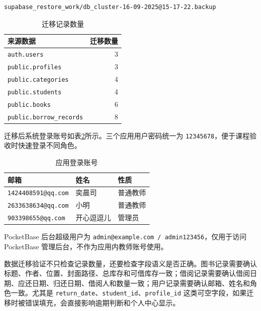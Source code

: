 \begin{lstlisting}[style=codexcode]
supabase_restore_work/db_cluster-16-09-2025@15-17-22.backup
\end{lstlisting}

\begin{table}[htbp]
\centering
\caption{迁移记录数量}
\label{tab:migration-count}
\begin{tabular}{l|r}
\toprule
\textbf{来源数据} & \textbf{迁移数量} \\
\midrule
\texttt{auth.users} & 3 \\
\texttt{public.profiles} & 3 \\
\texttt{public.categories} & 4 \\
\texttt{public.students} & 4 \\
\texttt{public.books} & 6 \\
\texttt{public.borrow\_records} & 8 \\
\bottomrule
\end{tabular}
\end{table}

迁移后系统登录账号如表\ref{tab:accounts}所示。三个应用用户密码统一为 \texttt{12345678}，便于课程验收时快速登录不同角色。

\begin{table}[htbp]
\centering
\caption{应用登录账号}
\label{tab:accounts}
\begin{tabular}{lll}
\toprule
\textbf{邮箱} & \textbf{姓名} & \textbf{性质} \\
\midrule
\texttt{1424408591@qq.com} & 奕晨司 & 普通教师 \\
\texttt{2633638634@qq.com} & 小明 & 普通教师 \\
\texttt{903398655@qq.com} & 开心逗逗儿 & 管理员 \\
\bottomrule
\end{tabular}
\end{table}

PocketBase 后台超级用户为 \texttt{admin@example.com / admin123456}，仅用于访问 PocketBase 管理后台，不作为应用内教师账号使用。

数据迁移验证不只检查记录数量，还要检查字段语义是否正确。图书记录需要确认标题、作者、位置、封面路径、总库存和可借库存一致；借阅记录需要确认借阅日期、应还日期、归还日期、借阅人和数量一致；用户记录需要确认邮箱、姓名和角色一致。尤其是 \texttt{return\_date}、\texttt{student\_id}、\texttt{profile\_id} 这类可空字段，如果迁移时被错误填充，会直接影响逾期判断和个人中心显示。

